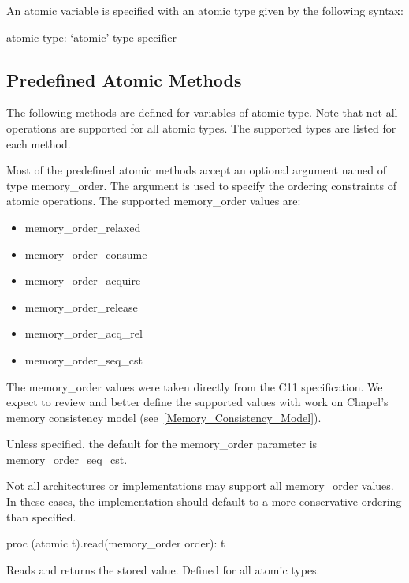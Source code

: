 An atomic variable is specified with an atomic type given by the 
following syntax:

\begin{syntax}
atomic-type:
  `atomic' type-specifier
\end{syntax}

\subsection{Predefined Atomic Methods}
\label{Functions_on_Atomic_Variables}

The following methods are defined for variables of atomic type. Note
that not all operations are supported for all atomic types. The
supported types are listed for each method.  

Most of the predefined atomic methods accept an optional argument
named  of type memory\_order. The  argument is
used to specify the ordering constraints of atomic operations. The
supported memory\_order values are:
\begin{itemize}
\item{memory\_order\_relaxed}
\item{memory\_order\_consume}
\item{memory\_order\_acquire}
\item{memory\_order\_release}
\item{memory\_order\_acq\_rel}
\item{memory\_order\_seq\_cst}
\end{itemize}

\begin{openissue}
  The memory\_order values were taken directly from the C11
  specification.  We expect to review and better define the supported
  values with work on Chapel's memory consistency model
  (see~\ref{Memory_Consistency_Model}).
\end{openissue}

Unless specified, the default for the memory\_order parameter is
memory\_order\_seq\_cst.

\begin{note}
Not all architectures or implementations may support all memory\_order
values.  In these cases, the implementation should default to a more
conservative ordering than specified.
\end{note}

\begin{protohead}
proc (atomic t).read(memory_order order): t
\end{protohead}
\begin{protobody}
Reads and returns the stored value. Defined for all atomic types.  
\end{protobody}


